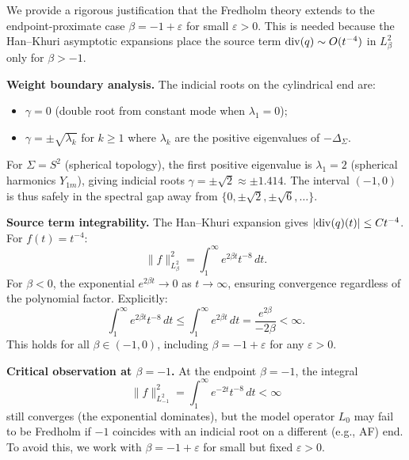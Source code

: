 \begin{remark}[Marginal Weight Case: $\beta = -1 + \varepsilon$]\label{rem:MarginalWeight}
We provide a rigorous justification that the Fredholm theory extends to the endpoint-proximate case $\beta = -1 + \varepsilon$ for small $\varepsilon > 0$. This is needed because the Han--Khuri asymptotic expansions place the source term $\mathrm{div}(q) \sim O(t^{-4})$ in $L^2_\beta$ only for $\beta > -1$.

\textbf{Weight boundary analysis.} The indicial roots on the cylindrical end are:
\begin{itemize}
    \item $\gamma = 0$ (double root from constant mode when $\lambda_1 = 0$);
    \item $\gamma = \pm \sqrt{\lambda_k}$ for $k \ge 1$ where $\lambda_k$ are the positive eigenvalues of $-\Delta_\Sigma$.
\end{itemize}
For $\Sigma = S^2$ (spherical topology), the first positive eigenvalue is $\lambda_1 = 2$ (spherical harmonics $Y_{1m}$), giving indicial roots $\gamma = \pm \sqrt{2} \approx \pm 1.414$. The interval $(-1, 0)$ is thus safely in the spectral gap away from $\{0, \pm\sqrt{2}, \pm\sqrt{6}, \ldots\}$.

\textbf{Source term integrability.} The Han--Khuri expansion gives $|\mathrm{div}(q)(t)| \le C t^{-4}$. For $f(t) = t^{-4}$:
\[
    \|f\|_{L^2_\beta}^2 = \int_1^\infty e^{2\beta t} t^{-8} \, dt.
\]
For $\beta < 0$, the exponential $e^{2\beta t} \to 0$ as $t \to \infty$, ensuring convergence regardless of the polynomial factor. Explicitly:
\[
    \int_1^\infty e^{2\beta t} t^{-8} \, dt \le \int_1^\infty e^{2\beta t} \, dt = \frac{e^{2\beta}}{-2\beta} < \infty.
\]
This holds for all $\beta \in (-1, 0)$, including $\beta = -1 + \varepsilon$ for any $\varepsilon > 0$.

\textbf{Critical observation at $\beta = -1$.} At the endpoint $\beta = -1$, the integral
\[
    \|f\|_{L^2_{-1}}^2 = \int_1^\infty e^{-2t} t^{-8} \, dt < \infty
\]
still converges (the exponential dominates), but the model operator $L_0$ may fail to be Fredholm if $-1$ coincides with an indicial root on a different (e.g., AF) end. To avoid this, we work with $\beta = -1 + \varepsilon$ for small but fixed $\varepsilon > 0$.


\end{remark}
